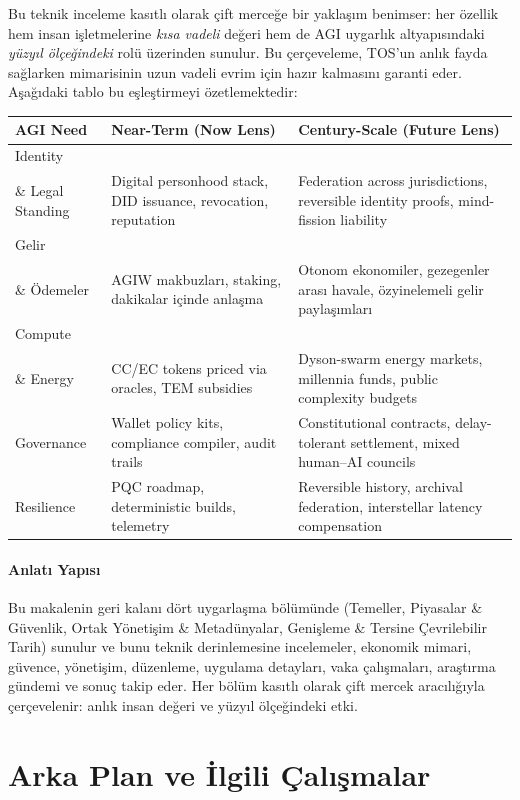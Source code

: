 \documentclass[11pt]{article}
\begin{document}
Bu teknik inceleme kasıtlı olarak çift merceğe bir yaklaşım benimser: her özellik hem insan işletmelerine \emph{kısa vadeli} değeri hem de AGI uygarlık altyapısındaki \emph{yüzyıl ölçeğindeki} rolü üzerinden sunulur. Bu çerçeveleme, TOS'un anlık fayda sağlarken mimarisinin uzun vadeli evrim için hazır kalmasını garanti eder. Aşağıdaki tablo bu eşleştirmeyi özetlemektedir:

\begin{longtable}{@{}p{}p{}p{}@{}}
\toprule
\textbf{AGI Need} & \textbf{Near-Term (Now Lens)} & \textbf{Century-Scale (Future Lens)} \\\midrule
Identity \\ \& Legal Standing & Digital personhood stack, DID issuance, revocation, reputation & Federation across jurisdictions, reversible identity proofs, mind-fission liability \\
Gelir \\ \& Ödemeler & AGIW makbuzları, staking, dakikalar içinde anlaşma & Otonom ekonomiler, gezegenler arası havale, özyinelemeli gelir paylaşımları \\
Compute \\ \& Energy & CC/EC tokens priced via oracles, TEM subsidies & Dyson-swarm energy markets, millennia funds, public complexity budgets \\
Governance & Wallet policy kits, compliance compiler, audit trails & Constitutional contracts, delay-tolerant settlement, mixed human--AI councils \\
Resilience & PQC roadmap, deterministic builds, telemetry & Reversible history, archival federation, interstellar latency compensation \\\bottomrule
\end{longtable}

\paragraph{Anlatı Yapısı} Bu makalenin geri kalanı dört uygarlaşma bölümünde (Temeller, Piyasalar \& Güvenlik, Ortak Yönetişim \& Metadünyalar, Genişleme \& Tersine Çevrilebilir Tarih) sunulur ve bunu teknik derinlemesine incelemeler, ekonomik mimari, güvence, yönetişim, düzenleme, uygulama detayları, vaka çalışmaları, araştırma gündemi ve sonuç takip eder. Her bölüm kasıtlı olarak çift mercek aracılığıyla çerçevelenir: anlık insan değeri ve yüzyıl ölçeğindeki etki.

\section{Arka Plan ve İlgili Çalışmalar}
\end{document}
